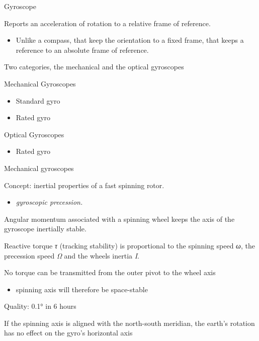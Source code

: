 \documentclass[compress]{beamer}
\begin{document}
\begin{frame}{Gyroscope}

Reports an acceleration of rotation to a relative frame of reference.

\begin{itemize}

\item
  Unlike a compass, that keep the orientation to a fixed frame, that
  keeps a reference to an absolute frame of reference.
\end{itemize}

Two categories, the mechanical and the optical gyroscopes

Mechanical Gyroscopes

\begin{itemize}

\item
  Standard gyro
\item
  Rated gyro
\end{itemize}

Optical Gyroscopes

\begin{itemize}

\item
  Rated gyro
\end{itemize}

\end{frame}

\begin{frame}{Mechanical gyroscopes}

Concept: inertial properties of a fast spinning rotor.

\begin{itemize}

\item
  \emph{gyroscopic precession.}
\end{itemize}

Angular momentum associated with a spinning wheel keeps the axis of the
gyroscope inertially stable.

Reactive torque \emph{τ} (tracking stability) is proportional to the
spinning speed \emph{ω}, the precession speed \emph{Ω} and the wheels
inertia \emph{I}.

No torque can be transmitted from the outer pivot to the wheel axis

\begin{itemize}

\item
  spinning axis will therefore be space-stable
\end{itemize}

Quality: 0.1° in 6 hours

If the spinning axis is aligned with the north-south meridian, the
earth's rotation has no effect on the gyro's horizontal axis

\end{frame}
\end{document}
